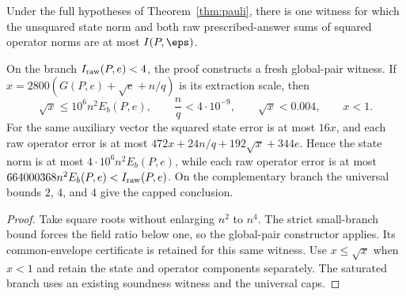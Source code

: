 \begin{theorem}
\label{thm:pauli-final-degree-two-soundness}
\leanok
{}
Under the full hypotheses of Theorem~\ref{thm:pauli}, there is one witness for
which the unsquared state norm and both raw prescribed-answer sums of squared
operator norms are at most $I(P,\eps)$.

On the branch $I_{\rm raw}(P,e)<4$, the proof constructs a fresh global-pair
witness.  If $x=2800(G(P,e)+\sqrt e+n/q)$ is its extraction scale, then
\[
 \sqrt x\leq10^6n^2E_b(P,e),\qquad \frac nq<4\cdot10^{-9},
 \qquad \sqrt x<0.004,\qquad x<1.
\]
For the same auxiliary vector the squared state error is at most $16x$, and
each raw operator error is at most
$472x+24n/q+192\sqrt x+344e$.  Hence the state norm is at most
$4\cdot10^6n^2E_b(P,e)$, while each raw operator error is at most
$664000368n^2E_b(P,e)<I_{\rm raw}(P,e)$.  On the complementary branch the
universal bounds $2$, $4$, and $4$ give the capped conclusion.
\end{theorem}
\begin{proof}
\leanok
{}
Take square roots without enlarging $n^2$ to $n^4$.  The strict small-branch
bound forces the field ratio below one, so the global-pair constructor applies.
Its common-envelope certificate is retained for this same witness. Use
$x\leq\sqrt x$ when $x<1$ and retain the state and operator components
separately. The saturated branch uses an existing soundness witness and the
universal caps.
\end{proof}

